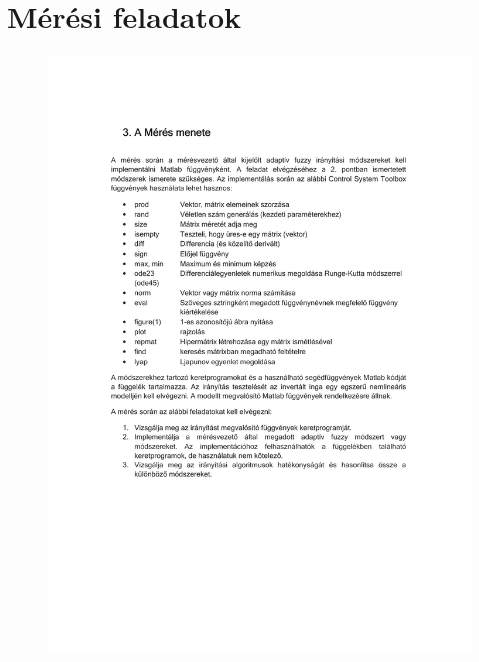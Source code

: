 \chapter{Mérési feladatok}\label{sect:LatexTools}

\begin{figure}[!ht]
	\includegraphics[trim = 30mm 80mm 30mm 173mm,clip, width=150mm,keepaspectratio]{figures/feladatok_m03.pdf}
	\label{fig:Road-of-a-char}
\end{figure}
